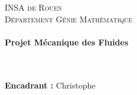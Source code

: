 \makeatletter
  \begin{titlepage}
  \centering
      {\large \textsc{INSA de Rouen}}\\
      \textsc{Département Génie Mathématique}\\
    \vspace{1cm}
      {\large\textbf{	\@date\\
       Projet Mécanique des Fluides}}\\
       \vspace{7cm}
       {\LARGE \textbf{\@title}} \\
    \vspace{2em}
        {\large \@author} \\
    \vfill

    \raggedleft
    {\large \textbf{Encadrant :} Christophe }\\
    \vspace{1cm}
  \end{titlepage}
\makeatother

\newpage
\tableofcontents
